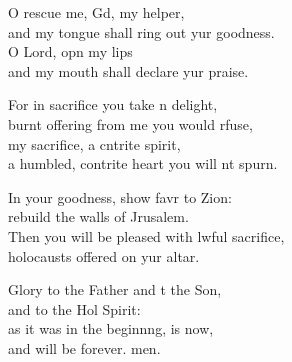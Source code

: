 \begin{psalmverse}
\begin{patverse}
O rescue me, Gd, my helper,\Med\\
and my tongue shall ring out yur goodness.\\
O Lord, opn my lips\Med\\
and my mouth shall declare yur praise.

For in sacrifice you take n delight,\Med\\
burnt offering from me you would rfuse,\\
my sacrifice, a cntrite spirit,\Med\\
a humbled, contrite heart you will nt spurn.

In your goodness, show favr to Zion:\Med\\
rebuild the walls of Jrusalem.\\
Then you will be pleased with lwful sacrifice,\Med\\
holocausts offered on yur altar.

Glory to the Father and t the Son,\Med\\
and to the Hol Spirit:\\
as it was in the beginn\pointup{\i}ng, is now,\Med\\
and will be forever. men.
  \end{patverse}
  \end{psalmverse}
